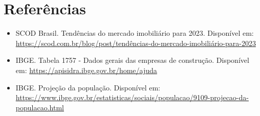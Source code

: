 \documentclass[12pt]{article}
\begin{document}
\section*{Referências}
\begin{itemize}
    \item SCOD Brasil. Tendências do mercado imobiliário para 2023. Disponível em: \url{https://scod.com.br/blog/post/tendências-do-mercado-imobiliário-para-2023}
    \item IBGE. Tabela 1757 - Dados gerais das empresas de construção. Disponível em: \url{https://apisidra.ibge.gov.br/home/ajuda}
    \item IBGE. Projeção da população. Disponível em: \url{https://www.ibge.gov.br/estatisticas/sociais/populacao/9109-projecao-da-populacao.html}
\end{itemize}
\end{document}
